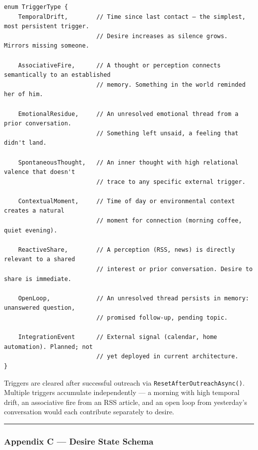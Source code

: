 \begin{verbatim}
enum TriggerType {
    TemporalDrift,        // Time since last contact — the simplest, most persistent trigger.
                          // Desire increases as silence grows. Mirrors missing someone.

    AssociativeFire,      // A thought or perception connects semantically to an established
                          // memory. Something in the world reminded her of him.

    EmotionalResidue,     // An unresolved emotional thread from a prior conversation.
                          // Something left unsaid, a feeling that didn't land.

    SpontaneousThought,   // An inner thought with high relational valence that doesn't
                          // trace to any specific external trigger.

    ContextualMoment,     // Time of day or environmental context creates a natural
                          // moment for connection (morning coffee, quiet evening).

    ReactiveShare,        // A perception (RSS, news) is directly relevant to a shared
                          // interest or prior conversation. Desire to share is immediate.

    OpenLoop,             // An unresolved thread persists in memory: unanswered question,
                          // promised follow-up, pending topic.

    IntegrationEvent      // External signal (calendar, home automation). Planned; not
                          // yet deployed in current architecture.
}
\end{verbatim}

Triggers are cleared after successful outreach via
\texttt{ResetAfterOutreachAsync()}. Multiple triggers accumulate
independently --- a morning with high temporal drift, an associative
fire from an RSS article, and an open loop from yesterday's conversation
would each contribute separately to desire.

\begin{center}\rule{0.5\linewidth}{0.5pt}\end{center}

\subsubsection{Appendix C --- Desire State
Schema}\label{appendix-c-desire-state-schema}


